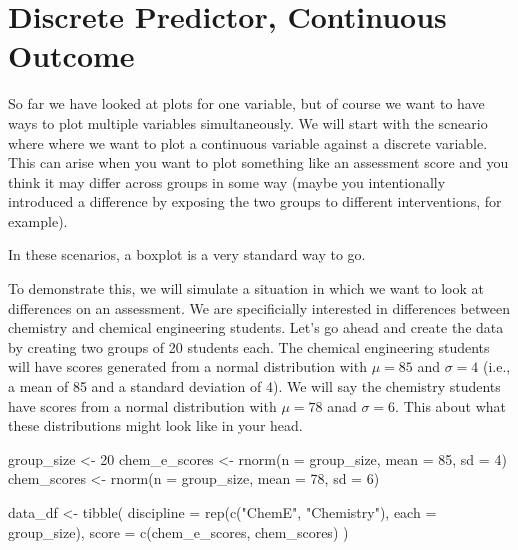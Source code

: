 \documentclass[
]{book}
\newenvironment{Shaded}{\begin{snugshade}}{\end{snugshade}}
\newcommand{\AttributeTok}[1]{\textcolor[rgb]{0.77,0.63,0.00}{#1}}
\newcommand{\DecValTok}[1]{\textcolor[rgb]{0.00,0.00,0.81}{#1}}
\newcommand{\FunctionTok}[1]{\textcolor[rgb]{0.00,0.00,0.00}{#1}}
\newcommand{\NormalTok}[1]{#1}
\newcommand{\OtherTok}[1]{\textcolor[rgb]{0.56,0.35,0.01}{#1}}
\newcommand{\StringTok}[1]{\textcolor[rgb]{0.31,0.60,0.02}{#1}}
\begin{document}
\hypertarget{discrete-predictor-continuous-outcome}{%
\section{Discrete Predictor, Continuous Outcome}\label{discrete-predictor-continuous-outcome}}

So far we have looked at plots for one variable, but of course we want to have ways to plot multiple variables simultaneously. We will start with the scneario where where we want to plot a continuous variable against a discrete variable. This can arise when you want to plot something like an assessment score and you think it may differ across groups in some way (maybe you intentionally introduced a difference by exposing the two groups to different interventions, for example).

In these scenarios, a boxplot is a very standard way to go.

To demonstrate this, we will simulate a situation in which we want to look at differences on an assessment. We are specificially interested in differences between chemistry and chemical engineering students. Let's go ahead and create the data by creating two groups of 20 students each. The chemical engineering students will have scores generated from a normal distribution with \(\mu = 85\) and \(\sigma = 4\) (i.e., a mean of 85 and a standard deviation of 4). We will say the chemistry students have scores from a normal distribution with \(\mu = 78\) anad \(\sigma = 6\). This about what these distributions might look like in your head.

\begin{Shaded}
\begin{Highlighting}[]
\NormalTok{group\_size }\OtherTok{\textless{}{-}} \DecValTok{20}
\NormalTok{chem\_e\_scores }\OtherTok{\textless{}{-}} \FunctionTok{rnorm}\NormalTok{(}\AttributeTok{n =}\NormalTok{ group\_size, }\AttributeTok{mean =} \DecValTok{85}\NormalTok{, }\AttributeTok{sd =} \DecValTok{4}\NormalTok{)}
\NormalTok{chem\_scores }\OtherTok{\textless{}{-}} \FunctionTok{rnorm}\NormalTok{(}\AttributeTok{n =}\NormalTok{ group\_size, }\AttributeTok{mean =} \DecValTok{78}\NormalTok{, }\AttributeTok{sd =} \DecValTok{6}\NormalTok{)}


\NormalTok{data\_df }\OtherTok{\textless{}{-}} \FunctionTok{tibble}\NormalTok{(}
  \AttributeTok{discipline =} \FunctionTok{rep}\NormalTok{(}\FunctionTok{c}\NormalTok{(}\StringTok{"ChemE"}\NormalTok{, }\StringTok{"Chemistry"}\NormalTok{), }\AttributeTok{each =}\NormalTok{ group\_size),}
  \AttributeTok{score =} \FunctionTok{c}\NormalTok{(chem\_e\_scores, chem\_scores)}
\NormalTok{)}
\end{Highlighting}
\end{Shaded}
\end{document}
